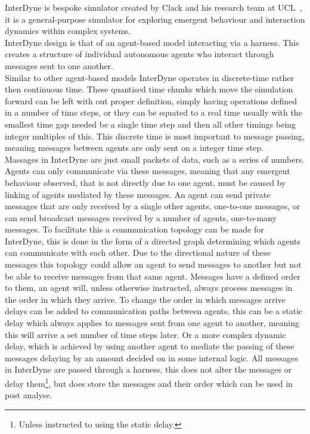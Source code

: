 \documentclass{article}
\begin{document}
InterDyne is bespoke simulator created by Clack and his research team at UCL~\cite{Chris_webPage}, it is a general-purpose simulator for exploring emergent behaviour and interaction dynamics within complex systems.\\
InterDyne design is that of an agent-based model interacting via a harness. This creates a structure of individual autonomous agents who interact through messages sent to one another.\\ 
Similar to other agent-based models InterDyne operates in discrete-time rather then continuous time. These quantised time chunks which move the simulation forward can be left with out proper definition, simply having operations defined in a number of time steps, or they can be equated to a real time usually with the smallest time gap needed be a single time step and then all other timings being integer multiples of this. This discrete time is most important to message passing, meaning messages between agents are only sent on a integer time step.\\ 
Massages in InterDyne are just small packets of data, such as a series of numbers.  Agents can only communicate via these messages, meaning that any emergent behaviour observed, that is not directly due to one agent, must be caused by linking of agents mediated by these messages. An agent can send private messages that are only received by a single other agents, one-to-one messages, or can send broadcast messages received by a number of agents, one-to-many messages. To facilitate this a communication topology can be made for InterDyne, this is done in the form of a directed graph determining which agents can communicate with each other. Due to the directional nature of these messages this topology could allow an agent to send messages to another but not be able to receive messages from that same agent. Messages have a defined order to them, an agent will, unless otherwise instructed, always process messages in the order in which they arrive. To change the order in which messages arrive delays can be added to communication paths between agents, this can be a static delay which always applies to messages sent from one agent to another, meaning this will arrive a set number of time steps later. Or a more complex dynamic delay, which is achieved by using another agent to mediate the passing of these messages delaying by an amount decided on in some internal logic. All messages in InterDyne are passed through a harness, this does not alter the messages or delay them\footnote{Unless instructed to using the static delay.}, but does store the messages and their order which can be used in post analyse.\\         
\end{document}

